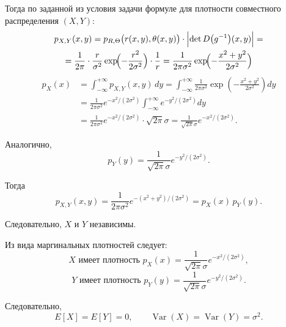 \documentclass[a4paper,14pt]{extarticle}
\begin{document}
            Тогда по заданной из условия задачи формуле для плотности совместного распределения $(X,Y)$:
            \[
                \begin{gathered}
                    p_{X,Y}(x,y) =
                    p_{R,\Theta}\bigl(r(x,y),\theta(x,y)\bigr)\cdot\Bigl|\det D\bigl(g^{-1}\bigr)(x,y)\Bigr| = \\
                    = \frac{1}{2\pi}\cdot\frac{r}{\sigma^2}\exp\!\Bigl(-\frac{r^2}{2\sigma^2}\Bigr)\cdot\frac{1}{r} =
                    \frac{1}{2\pi\sigma^2}\exp\!\Bigl(-\frac{x^2+y^2}{2\sigma^2}\Bigr)
                \end{gathered}
            \]
            \[
                \begin{aligned}
                    p_X(x)
                    &= \int_{-\infty}^{+\infty} p_{X,Y}(x,y)\,dy
                    = \int_{-\infty}^{+\infty} \frac{1}{2\pi\sigma^2}
                    \exp\!\left(-\frac{x^2+y^2}{2\sigma^2}\right) dy \\
                    &= \frac{1}{2\pi\sigma^2} e^{-x^2/(2\sigma^2)}
                    \int_{-\infty}^{+\infty} e^{-y^2/(2\sigma^2)} dy \\
                    &= \frac{1}{2\pi\sigma^2} e^{-x^2/(2\sigma^2)} \cdot \sqrt{2\pi}\sigma
                    = \frac{1}{\sqrt{2\pi}\sigma} e^{-x^2/(2\sigma^2)}.
                \end{aligned}
            \]
            
            Аналогично,
            \[
                p_Y(y) = \frac{1}{\sqrt{2\pi}\sigma} e^{-y^2/(2\sigma^2)}.
            \]
            
            Тогда
            \[
                p_{X,Y}(x,y)
                = \frac{1}{2\pi\sigma^2} e^{-(x^2+y^2)/(2\sigma^2)}
                = p_X(x) \, p_Y(y).
            \]
            
            Следовательно, $X$ и $Y$ независимы.
            
            Из вида маргинальных плотностей следует:
            \[
                X \text{ имеет плотность }
                p_X(x)=\frac{1}{\sqrt{2\pi}\sigma} e^{-x^2/(2\sigma^2)},\]
            \[
                Y \text{ имеет плотность }
                p_Y(y)=\frac{1}{\sqrt{2\pi}\sigma} e^{-y^2/(2\sigma^2)}.
            \]
            
            Следовательно,
            \[
                E[X] = E[Y] = 0, \qquad
                \operatorname{Var}(X) = \operatorname{Var}(Y) = \sigma^2.
            \]
            
\end{document}
